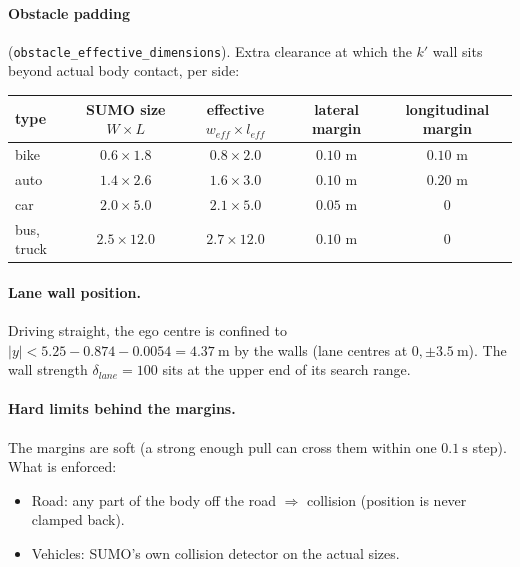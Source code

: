\documentclass[11pt,a4paper]{article}
\begin{document}
\paragraph{Obstacle padding} (\texttt{obstacle\_effective\_dimensions}). Extra clearance at which the $k'$ wall sits
beyond actual body contact, per side:
\begin{center}
\small
\begin{tabular}{lcccc}
  \toprule
  type & SUMO size $W \times L$ & effective $w_{eff} \times l_{eff}$ & lateral margin & longitudinal margin \\
  \midrule
  bike       & $0.6 \times 1.8$  & $0.8 \times 2.0$  & $0.10$ m & $0.10$ m \\
  auto       & $1.4 \times 2.6$  & $1.6 \times 3.0$  & $0.10$ m & $0.20$ m \\
  car        & $2.0 \times 5.0$  & $2.1 \times 5.0$  & $0.05$ m & $0$ \\
  bus, truck & $2.5 \times 12.0$ & $2.7 \times 12.0$ & $0.10$ m & $0$ \\
  \bottomrule
\end{tabular}
\end{center}

\paragraph{Lane wall position.} Driving straight, the ego centre is confined to
$|y| < 5.25 - 0.874 - 0.0054 = 4.37~\mathrm{m}$ by the walls (lane centres at $0, \pm 3.5~\mathrm{m}$).
The wall strength $\delta_{lane} = 100$ sits at the upper end of its search range.

\paragraph{Hard limits behind the margins.} The margins are soft (a strong enough pull can cross them within one
$0.1~\mathrm{s}$ step). What is enforced:
\begin{itemize}
  \item Road: any part of the body off the road $\Rightarrow$ collision (position is never clamped back).
  \item Vehicles: SUMO's own collision detector on the actual sizes.
\end{itemize}

\end{document}
